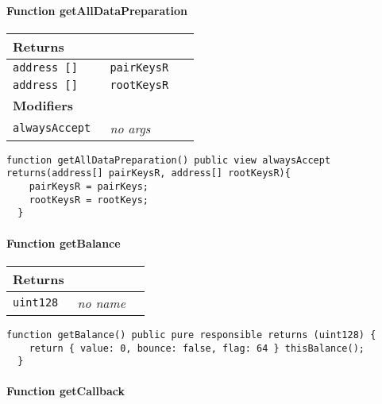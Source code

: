 \paragraph{Function getAllDataPreparation}


\ifsoltables
\noindent\begin{tabular}{|l|l|p{5cm}|}\hline
\multicolumn{3}{|l|}{\bf Returns}\\\hline
\tt address [] & \tt pairKeysR &\\\hline
\tt address [] & \tt rootKeysR &\\\hline
\multicolumn{3}{|l|}{\bf Modifiers}\\\hline
\tt alwaysAccept & {\em no args} &\\\hline
\end{tabular}
\fi

\vspace{2cm}

\begin{lstlisting}[firstnumber=215]
  function getAllDataPreparation() public view alwaysAccept returns(address[] pairKeysR, address[] rootKeysR){
    pairKeysR = pairKeys;
    rootKeysR = rootKeys;
  }
\end{lstlisting}

\paragraph{Function getBalance}


\ifsoltables
\noindent\begin{tabular}{|l|l|p{5cm}|}\hline
\multicolumn{3}{|l|}{\bf Returns}\\\hline
\tt uint128 & {\em no name} &\\\hline
\end{tabular}
\fi

\vspace{2cm}

\begin{lstlisting}[firstnumber=351]
  function getBalance() public pure responsible returns (uint128) {
    return { value: 0, bounce: false, flag: 64 } thisBalance();
  }
\end{lstlisting}

\paragraph{Function getCallback}



